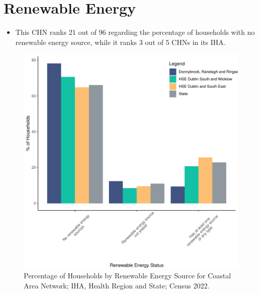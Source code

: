 \documentclass{article}
\begin{document}
\section{Renewable Energy}\label{sect:RE}
\begin{itemize}
\item This CHN ranks  21 out of 96 regarding the percentage of households with no renewable energy source, while it ranks   3 out of 5 CHNs in its IHA.
\end{itemize}
\begin{figure}[H]
	\centering
	\includegraphics[width = 140mm]{../figures/RenewableEnergyED.pdf}
	\caption{Percentage of Households by Renewable Energy Source for Coastal Area Network; IHA, Health Region and State; Census 2022.}
	\label{fig:vbnv}
	\end{figure}
\end{document}

